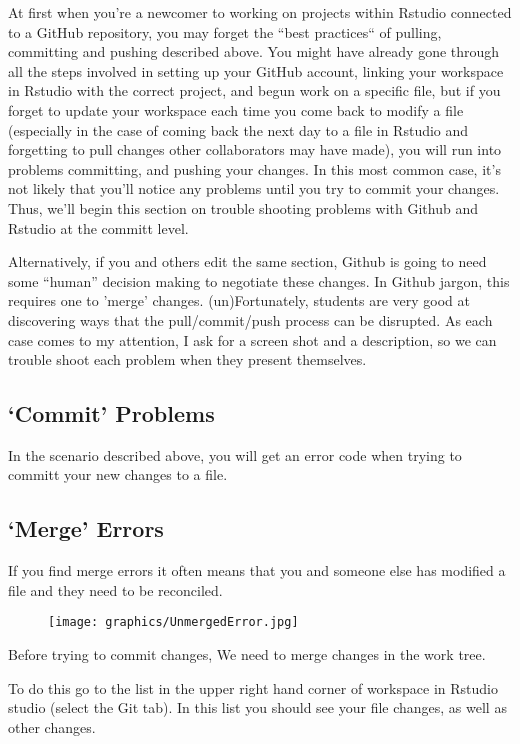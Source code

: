 \documentclass[12pt]{../SOP4_alpha}\usepackage[]{graphicx}\usepackage[]{xcolor}
\begin{document}
\NP At first when you're a newcomer to working on projects within Rstudio connected to a GitHub repository, you may forget the ``best practices`` of pulling, committing and pushing described above. You might have already gone through all the steps involved in setting up your GitHub account, linking your workspace in Rstudio with the correct project, and begun work on a specific file, but if you forget to update your workspace each time you come back to modify a file (especially in the case of coming back the next day to a file in Rstudio and forgetting to pull changes other collaborators may have made), you will run into problems committing, and pushing your changes. In this most common case, it's not likely that you'll notice any problems until you try to commit your changes. Thus, we'll begin this section on trouble shooting problems with Github and Rstudio at the committ level.

\NP Alternatively, if you and others edit the same section, Github is going to need some ``human'' decision making to negotiate these changes. In Github jargon, this requires one to 'merge' changes. 
\NP (un)Fortunately, students are very good at discovering ways that the pull/commit/push process can be disrupted. As each case comes to my attention, I ask for a screen shot and a description, so we can trouble shoot each problem when they present themselves.

\subsection{`Commit' Problems}
\NP In the scenario described above, you will get an error code when trying to committ your new changes to a file. 

\subsection{`Merge' Errors}

\NP If you find merge errors it often means that you and someone else has modified a file and they need to be reconciled.

\begin{figure}
\centering
\texttt{[image: graphics/UnmergedError.jpg]}
\end{figure}

\NP Before trying to commit changes, We need to merge changes in the work tree. 

\NP To do this go to the list in the upper right hand corner of workspace in Rstudio studio (select the Git tab). In this list you should see your file changes, as well as other changes. 
\end{document}
